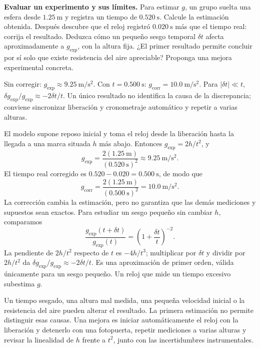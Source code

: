 \begin{ejercicio}
\textbf{Evaluar un experimento y sus límites.} Para estimar \(g\), un grupo suelta una esfera desde \(\SI{1.25}{\meter}\) y registra un tiempo de \(\SI{0.520}{\second}\). Calcule la estimación obtenida. Después descubre que el reloj registró \(\SI{0.020}{\second}\) más que el tiempo real: corrija el resultado. Deduzca cómo un pequeño sesgo temporal \(\delta t\) afecta aproximadamente a \(g_{\text{exp}}\), con la altura fija. ¿El primer resultado permite concluir por sí solo que existe resistencia del aire apreciable? Proponga una mejora experimental concreta.
\end{ejercicio}
\begin{respuesta}
Sin corregir: \(g_{\text{exp}}\approx\SI{9.25}{\meter\per\second\squared}\). Con \(t=\SI{0.500}{\second}\): \(g_{\text{corr}}=\SI{10.0}{\meter\per\second\squared}\). Para \(\lvert\delta t\rvert\ll t\), \(\delta g_{\text{exp}}/g_{\text{exp}}\approx-2\delta t/t\). Un único resultado no identifica la causa de la discrepancia; conviene sincronizar liberación y cronometraje automático y repetir a varias alturas.
\end{respuesta}
\begin{explicacion}
El modelo supone reposo inicial y toma el reloj desde la liberación hasta la llegada a una marca situada \(h\) más abajo. Entonces \(g_{\text{exp}}=2h/t^2\), y
\[ g_{\text{exp}}=\frac{2(\SI{1.25}{\meter})}{(\SI{0.520}{\second})^2}\approx\SI{9.25}{\meter\per\second\squared}. \]
El tiempo real corregido es \(0.520-0.020=\SI{0.500}{\second}\), de modo que
\[ g_{\text{corr}}=\frac{2(\SI{1.25}{\meter})}{(\SI{0.500}{\second})^2}=\SI{10.0}{\meter\per\second\squared}. \]
La corrección cambia la estimación, pero no garantiza que las demás mediciones y supuestos sean exactos. Para estudiar un sesgo pequeño sin cambiar \(h\), comparamos
\[ \frac{g_{\text{exp}}(t+\delta t)}{g_{\text{exp}}(t)}=\left(1+\frac{\delta t}{t}\right)^{-2}. \]
La pendiente de \(2h/t^2\) respecto de \(t\) es \(-4h/t^3\); multiplicar por \(\delta t\) y dividir por \(2h/t^2\) da \(\delta g_{\text{exp}}/g_{\text{exp}}\approx-2\delta t/t\). Es una aproximación de primer orden, válida únicamente para un sesgo pequeño. Un reloj que mide un tiempo excesivo subestima \(g\).

Un tiempo sesgado, una altura mal medida, una pequeña velocidad inicial o la resistencia del aire pueden alterar el resultado. La primera estimación no permite distinguir esas causas. Una mejora es iniciar automáticamente el reloj con la liberación y detenerlo con una fotopuerta, repetir mediciones a varias alturas y revisar la linealidad de \(h\) frente a \(t^2\), junto con las incertidumbres instrumentales.
\end{explicacion}


